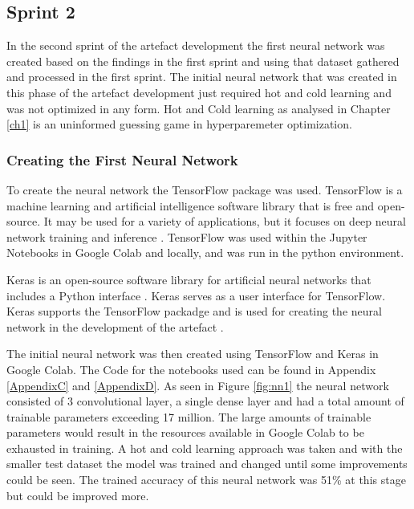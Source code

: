 \subsection{Sprint 2}
 
In the second sprint of the artefact development the first neural network was created based on the findings in the first sprint and using that dataset gathered and processed in the first sprint. The initial neural network that was created in this phase of the artefact development just required hot and cold learning and was not optimized in any form. Hot and Cold learning as analysed in Chapter \ref{ch1} is an uninformed guessing game in hyperparemeter optimization.

\subsubsection{Creating the First Neural Network}

To create the neural network the TensorFlow package was used. TensorFlow is a machine learning and artificial intelligence software library that is free and open-source. It may be used for a variety of applications, but it focuses on deep neural network training and inference \citep{tensor2016}. TensorFlow was used within the Jupyter Notebooks in Google Colab and locally, and was run in the python environment.

 Keras is an open-source software library for artificial neural networks that includes a Python interface \citep{kerascnn2017}. Keras serves as a user interface for TensorFlow. Keras supports the TensorFlow packadge and is used for creating the neural network in the development of the artefact \citep{kerascnn2017}.
 
The initial neural network was then created using TensorFlow and Keras in Google Colab. The Code for the notebooks used can be found in Appendix \ref{AppendixC} and \ref{AppendixD}. As seen in Figure \ref{fig:nn1} the neural network consisted of 3 convolutional layer, a single dense layer and had a total amount of trainable parameters exceeding 17 million. The large amounts of trainable parameters would result in the resources available in Google Colab to be exhausted in training. A hot and cold learning approach was taken and with the smaller test dataset the model was trained and changed until some improvements could be seen. The trained accuracy of this neural network was 51\% at this stage but could be improved more. 

